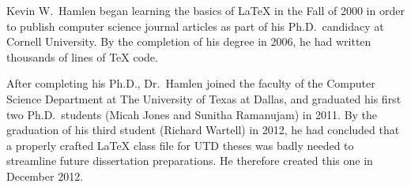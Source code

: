 \documentclass[doublespacing]{utdthesis}
\begin{document}
\begin{biosketch}
Kevin W.~Hamlen began learning the basics of \LaTeX{} in the Fall of 2000 in
order to publish computer science journal articles as part of his
Ph.D.~candidacy at Cornell University.
By the completion of his degree in 2006, he had written thousands of lines of
\TeX{} code.

After completing his Ph.D., Dr.~Hamlen joined the faculty of the Computer
Science Department at The University of Texas at Dallas, and graduated his
first two Ph.D.~students (Micah Jones and Sunitha Ramanujam) in 2011.
By the graduation of his third student (Richard Wartell) in 2012, he had
concluded that a properly crafted \LaTeX{} class file for UTD theses was badly
needed to streamline future dissertation preparations.
He therefore created this one in December 2012.
\end{biosketch}
\end{document}
